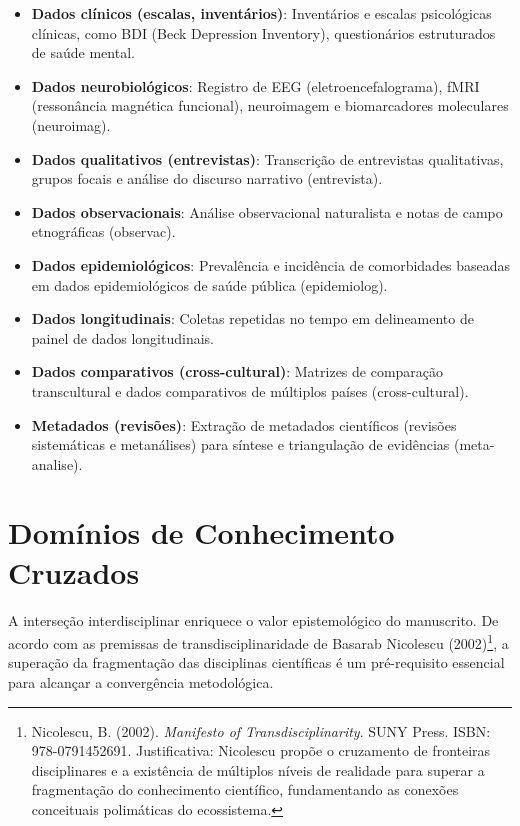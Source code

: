 \documentclass[12pt,a4paper,oneside]{abntex2}
\begin{document}
\begin{apendicesenv}
\begin{itemize}
    \item \textbf{Dados clínicos (escalas, inventários)}: Inventários e escalas psicológicas clínicas, como BDI (Beck Depression Inventory), questionários estruturados de saúde mental.

    \item \textbf{Dados neurobiológicos}: Registro de EEG (eletroencefalograma), fMRI (ressonância magnética funcional), neuroimagem e biomarcadores moleculares (neuroimag).

    \item \textbf{Dados qualitativos (entrevistas)}: Transcrição de entrevistas qualitativas, grupos focais e análise do discurso narrativo (entrevista).

    \item \textbf{Dados observacionais}: Análise observacional naturalista e notas de campo etnográficas (observac).

    \item \textbf{Dados epidemiológicos}: Prevalência e incidência de comorbidades baseadas em dados epidemiológicos de saúde pública (epidemiolog).

    \item \textbf{Dados longitudinais}: Coletas repetidas no tempo em delineamento de painel de dados longitudinais.

    \item \textbf{Dados comparativos (cross-cultural)}: Matrizes de comparação transcultural e dados comparativos de múltiplos países (cross-cultural).

    \item \textbf{Metadados (revisões)}: Extração de metadados científicos (revisões sistemáticas e metanálises) para síntese e triangulação de evidências (meta-analise).
\end{itemize}

\section{Domínios de Conhecimento Cruzados}

A interseção interdisciplinar enriquece o valor epistemológico do manuscrito. De acordo com as premissas de transdisciplinaridade de Basarab Nicolescu (2002)\footnote{Nicolescu, B. (2002). \textit{Manifesto of Transdisciplinarity}. SUNY Press. ISBN: 978-0791452691. Justificativa: Nicolescu propõe o cruzamento de fronteiras disciplinares e a existência de múltiplos níveis de realidade para superar a fragmentação do conhecimento científico, fundamentando as conexões conceituais polimáticas do ecossistema.}, a superação da fragmentação das disciplinas científicas é um pré-requisito essencial para alcançar a convergência metodológica.


\end{apendicesenv}
\end{document}

